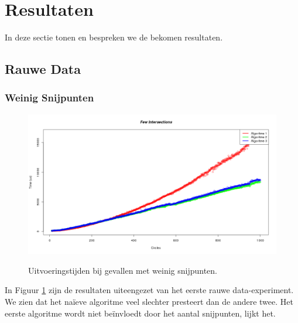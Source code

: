 \section{Resultaten}
In deze sectie tonen en bespreken we de bekomen resultaten.

\subsection{Rauwe Data}
\subsubsection{Weinig Snijpunten}
\begin{figure}[H]
   	\centering
   	\includegraphics[width=\textwidth]{illustraties/fewIntersections.png}
  	\label{fig:few_intersections}
  	\caption{Uitvoeringstijden bij gevallen met weinig snijpunten.}
\end{figure}
In Figuur \ref{fig:few_intersections} zijn de resultaten uiteengezet van het eerste rauwe data-experiment. We zien dat het na\"ieve algoritme veel slechter presteert dan de andere twee. Het eerste algoritme wordt niet be\"invloedt door het aantal snijpunten, lijkt het.
   
